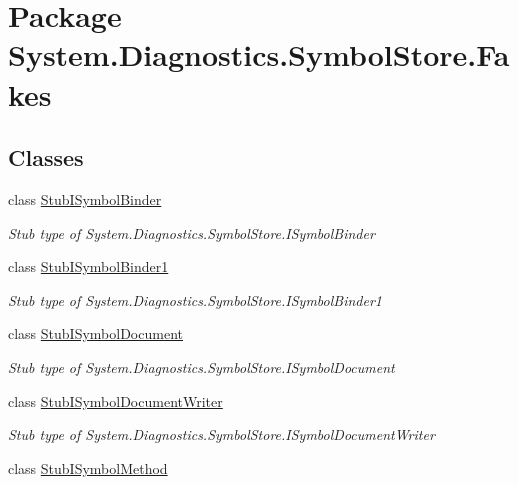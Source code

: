 \hypertarget{namespace_system_1_1_diagnostics_1_1_symbol_store_1_1_fakes}{\section{Package System.\-Diagnostics.\-Symbol\-Store.\-Fakes}
\label{namespace_system_1_1_diagnostics_1_1_symbol_store_1_1_fakes}
}
\subsection*{Classes}
\begin{DoxyCompactItemize}
\item 
class \hyperlink{class_system_1_1_diagnostics_1_1_symbol_store_1_1_fakes_1_1_stub_i_symbol_binder}{Stub\-I\-Symbol\-Binder}
\begin{DoxyCompactList}\small\item\em Stub type of System.\-Diagnostics.\-Symbol\-Store.\-I\-Symbol\-Binder\end{DoxyCompactList}\item 
class \hyperlink{class_system_1_1_diagnostics_1_1_symbol_store_1_1_fakes_1_1_stub_i_symbol_binder1}{Stub\-I\-Symbol\-Binder1}
\begin{DoxyCompactList}\small\item\em Stub type of System.\-Diagnostics.\-Symbol\-Store.\-I\-Symbol\-Binder1\end{DoxyCompactList}\item 
class \hyperlink{class_system_1_1_diagnostics_1_1_symbol_store_1_1_fakes_1_1_stub_i_symbol_document}{Stub\-I\-Symbol\-Document}
\begin{DoxyCompactList}\small\item\em Stub type of System.\-Diagnostics.\-Symbol\-Store.\-I\-Symbol\-Document\end{DoxyCompactList}\item 
class \hyperlink{class_system_1_1_diagnostics_1_1_symbol_store_1_1_fakes_1_1_stub_i_symbol_document_writer}{Stub\-I\-Symbol\-Document\-Writer}
\begin{DoxyCompactList}\small\item\em Stub type of System.\-Diagnostics.\-Symbol\-Store.\-I\-Symbol\-Document\-Writer\end{DoxyCompactList}\item 
class \hyperlink{class_system_1_1_diagnostics_1_1_symbol_store_1_1_fakes_1_1_stub_i_symbol_method}{Stub\-I\-Symbol\-Method}

\end{DoxyCompactItemize}
